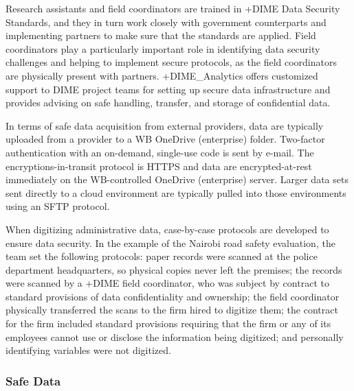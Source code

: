 \documentclass[
]{WileySix}
\begin{document}
Research assistants and field coordinators are trained in +DIME\textbar{} Data Security Standards, and they in turn work closely with government counterparts and implementing partners to make sure that the standards are applied. Field coordinators play a particularly important role in identifying data security challenges and helping to implement secure protocols, as the field coordinators are physically present with partners. +DIME\_Analytics\textbar{} offers customized support to DIME project teams for setting up secure data infrastructure and provides advising on safe handling, transfer, and storage of confidential data.

In terms of safe data acquisition from external providers, data are typically uploaded from a provider to a WB OneDrive (enterprise) folder. Two-factor authentication with an on-demand, single-use code is sent by e-mail. The encryptions-in-transit protocol is HTTPS and data are encrypted-at-rest immediately on the WB-controlled OneDrive (enterprise) server. Larger data sets sent directly to a cloud environment are typically pulled into those environments using an SFTP protocol.

When digitizing administrative data, case-by-case protocols are developed to ensure data security. In the example of the Nairobi road safety evaluation, the team set the following protocols: paper records were scanned at the police department headquarters, so physical copies never left the premises; the records were scanned by a +DIME\textbar{} field coordinator, who was subject by contract to standard provisions of data confidentiality and ownership; the field coordinator physically transferred the scans to the firm hired to digitize them; the contract for the firm included standard provisions requiring that the firm or any of its employees cannot use or disclose the information being digitized; and personally identifying variables were not digitized.

\hypertarget{safe-data-7}{%
\subsubsection{Safe Data}\label{safe-data-7}}
\end{document}
